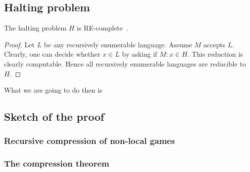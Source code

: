 
\subsection{Halting problem}

\begin{theorem}
    The halting problem $H$ is RE-complete~\cite{Algorithms}.
\begin{proof}
    Let $L$ be any recursively enumerable language. Assume $M$ accepts $L$. Clearly, one can decide whether $x \in L$ by asking if $M: x \in H$. This reduction is clearly computable. Hence all recursively enumerable languages are reducible to $H$.
\end{proof}
\end{theorem}

What we are going to do then is 
\subsection{Sketch of the proof}
\subsubsection{Recursive compression of non-local games}
\subsubsection{The compression theorem}